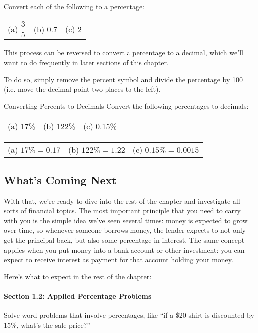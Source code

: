 \begin{try}
Convert each of the following to a percentage:\\

\begin{tabular}{l l l}
(a) $\dfrac{3}{5}$ & (b) $0.7$ & (c) 2
\end{tabular}
\end{try}

This process can be reversed to convert a percentage to a decimal, which we'll want to do frequently in later sections of this chapter.

To do so, simply remove the percent symbol and divide the percentage by 100 (i.e. move the decimal point two places to the left).

\begin{example}[https://www.youtube.com/watch?v=SphqHJVVMak]{Converting Percents to Decimals}
Convert the following percentages to decimals:\\

\begin{tabular}{l l l}
(a) 17\% & (b) 122\% & (c) 0.15\%
\end{tabular}

\sol
\begin{center}
\begin{tabular}{l l l}
(a) $17\% = 0.17$ & (b) $122\% = 1.22$ & (c) $0.15\% = 0.0015$
\end{tabular}
\end{center}
\end{example}
\pagebreak

\subsection{What's Coming Next}
With that, we're ready to dive into the rest of the chapter and investigate all sorts of financial topics.  The most important principle that you need to carry with you is the simple idea we've seen several times: money is expected to grow over time, so whenever someone borrows money, the lender expects to not only get the principal back, but also some percentage in interest.  The same concept applies when you put money into a bank account or other investment: you can expect to receive interest as payment for that account holding your money.

Here's what to expect in the rest of the chapter:
\paragraph{Section 1.2: Applied Percentage Problems} Solve word problems that involve percentages, like ``if a \$20 shirt is discounted by 15\%, what's the sale price?''

